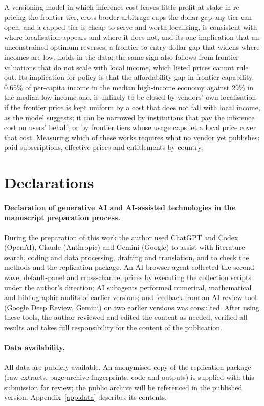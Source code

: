 \documentclass[11pt]{article}
\theoremstyle{definition}
\theoremstyle{remark}
\begin{document}
A versioning model in which inference cost leaves little profit at stake in re-pricing the frontier tier, cross-border arbitrage caps the dollar gap any tier can open, and a capped tier is cheap to serve and worth localising, is consistent with where localisation appears and where it does not, and its one implication that an unconstrained optimum reverses, a frontier-to-entry dollar gap that widens where incomes are low, holds in the data; the same sign also follows from frontier valuations that do not scale with local income, which listed prices cannot rule out. Its implication for policy is that the affordability gap in frontier capability, 0.65\% of per-capita income in the median high-income economy against 29\% in the median low-income one, is unlikely to be closed by vendors' own localisation if the frontier price is kept uniform by a cost that does not fall with local income, as the model suggests; it can be narrowed by institutions that pay the inference cost on users' behalf, or by frontier tiers whose usage caps let a local price cover that cost. Measuring which of these works requires what no vendor yet publishes: paid subscriptions, effective prices and entitlements by country.

\section*{Declarations}
\ifanon
\paragraph{Declaration of generative AI and AI-assisted technologies in the manuscript preparation process.} During the preparation of this work the author used ChatGPT and Codex (OpenAI), Claude (Anthropic) and Gemini (Google) to assist with literature search, coding and data processing, drafting and translation, and to check the methods and the replication package. An AI browser agent collected the second-wave, default-panel and cross-channel prices by executing the collection scripts under the author's direction; AI subagents performed numerical, mathematical and bibliographic audits of earlier versions; and feedback from an AI review tool (Google Deep Review, Gemini) on two earlier versions was consulted. After using these tools, the author reviewed and edited the content as needed, verified all results and takes full responsibility for the content of the publication.
\paragraph{Data availability.} All data are publicly available. An anonymised copy of the replication package (raw extracts, page archive fingerprints, code and outputs) is supplied with this submission for review; the public archive will be referenced in the published version. Appendix~\ref{app:data} describes its contents.
\end{document}
